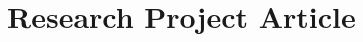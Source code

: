 
\chapter{Research Project Article} %

\label{AppendixC} %
%

\begin{minipage}{\textwidth}

\end{minipage}
